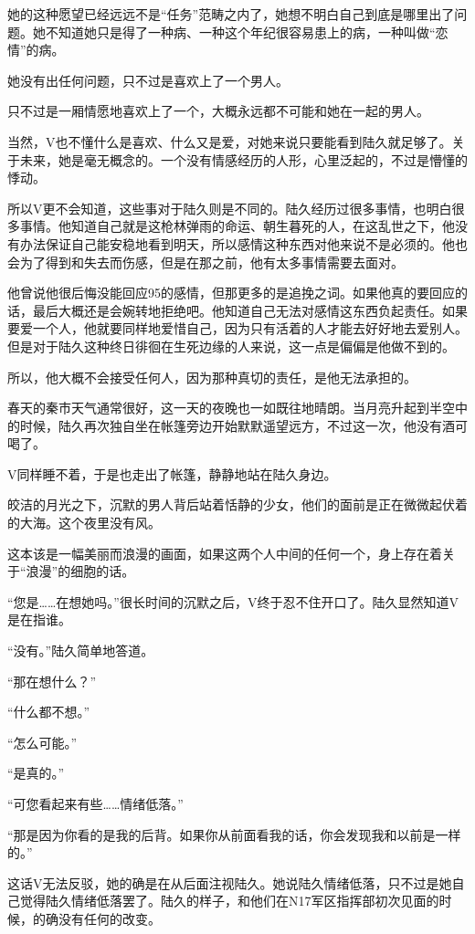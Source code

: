 她的这种愿望已经远远不是“任务”范畴之内了，她想不明白自己到底是哪里出了问题。她不知道她只是得了一种病、一种这个年纪很容易患上的病，一种叫做“恋情”的病。

她没有出任何问题，只不过是喜欢上了一个男人。

只不过是一厢情愿地喜欢上了一个，大概永远都不可能和她在一起的男人。

当然，V也不懂什么是喜欢、什么又是爱，对她来说只要能看到陆久就足够了。关于未来，她是毫无概念的。一个没有情感经历的人形，心里泛起的，不过是懵懂的悸动。

所以V更不会知道，这些事对于陆久则是不同的。陆久经历过很多事情，也明白很多事情。他知道自己就是这枪林弹雨的命运、朝生暮死的人，在这乱世之下，他没有办法保证自己能安稳地看到明天，所以感情这种东西对他来说不是必须的。他也会为了得到和失去而伤感，但是在那之前，他有太多事情需要去面对。

他曾说他很后悔没能回应95的感情，但那更多的是追挽之词。如果他真的要回应的话，最后大概还是会婉转地拒绝吧。他知道自己无法对感情这东西负起责任。如果要爱一个人，他就要同样地爱惜自己，因为只有活着的人才能去好好地去爱别人。但是对于陆久这种终日徘徊在生死边缘的人来说，这一点是偏偏是他做不到的。

所以，他大概不会接受任何人，因为那种真切的责任，是他无法承担的。

春天的秦市天气通常很好，这一天的夜晚也一如既往地晴朗。当月亮升起到半空中的时候，陆久再次独自坐在帐篷旁边开始默默遥望远方，不过这一次，他没有酒可喝了。

V同样睡不着，于是也走出了帐篷，静静地站在陆久身边。

皎洁的月光之下，沉默的男人背后站着恬静的少女，他们的面前是正在微微起伏着的大海。这个夜里没有风。

这本该是一幅美丽而浪漫的画面，如果这两个人中间的任何一个，身上存在着关于“浪漫”的细胞的话。

“您是……在想她吗。”很长时间的沉默之后，V终于忍不住开口了。陆久显然知道V是在指谁。

“没有。”陆久简单地答道。

“那在想什么？”

“什么都不想。”

“怎么可能。”

“是真的。”

“可您看起来有些……情绪低落。”

“那是因为你看的是我的后背。如果你从前面看我的话，你会发现我和以前是一样的。”

这话V无法反驳，她的确是在从后面注视陆久。她说陆久情绪低落，只不过是她自己觉得陆久情绪低落罢了。陆久的样子，和他们在N17军区指挥部初次见面的时候，的确没有任何的改变。

